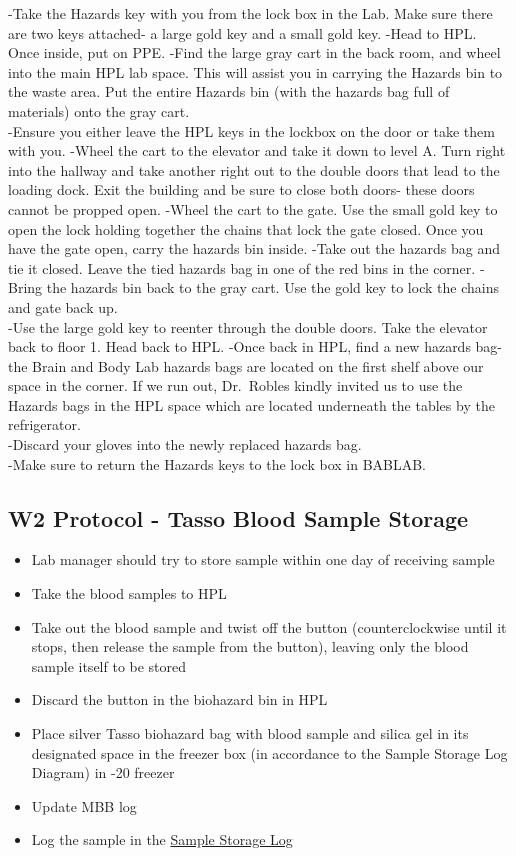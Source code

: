 \documentclass[
]{book}
\providecommand{\tightlist}{%
  \setlength{\itemsep}{0pt}\setlength{\parskip}{0pt}}
\begin{document}
-Take the Hazards key with you from the lock box in the Lab. Make sure there are two keys attached- a large gold key and a small gold key.
-Head to HPL. Once inside, put on PPE.
-Find the large gray cart in the back room, and wheel into the main HPL lab space. This will assist you in carrying the Hazards bin to the waste area. Put the entire Hazards bin (with the hazards bag full of materials) onto the gray cart.\\
-Ensure you either leave the HPL keys in the lockbox on the door or take them with you.
-Wheel the cart to the elevator and take it down to level A. Turn right into the hallway and take another right out to the double doors that lead to the loading dock. Exit the building and be sure to close both doors- these doors cannot be propped open.
-Wheel the cart to the gate. Use the small gold key to open the lock holding together the chains that lock the gate closed. Once you have the gate open, carry the hazards bin inside.
-Take out the hazards bag and tie it closed. Leave the tied hazards bag in one of the red bins in the corner.
-Bring the hazards bin back to the gray cart. Use the gold key to lock the chains and gate back up.\\
-Use the large gold key to reenter through the double doors. Take the elevator back to floor 1. Head back to HPL.
-Once back in HPL, find a new hazards bag- the Brain and Body Lab hazards bags are located on the first shelf above our space in the corner. If we run out, Dr.~Robles kindly invited us to use the Hazards bags in the HPL space which are located underneath the tables by the refrigerator.\\
-Discard your gloves into the newly replaced hazards bag.\\
-Make sure to return the Hazards keys to the lock box in BABLAB.

\hypertarget{w2-protocol---tasso-blood-sample-storage}{%
\subsection{W2 Protocol - Tasso Blood Sample Storage}\label{w2-protocol---tasso-blood-sample-storage}}

\begin{itemize}
\tightlist
\item
  Lab manager should try to store sample within one day of receiving sample
\item
  Take the blood samples to HPL
\item
  Take out the blood sample and twist off the button (counterclockwise until it stops, then release the sample from the button), leaving only the blood sample itself to be stored
\item
  Discard the button in the biohazard bin in HPL
\item
  Place silver Tasso biohazard bag with blood sample and silica gel in its designated space in the freezer box (in accordance to the Sample Storage Log Diagram) in -20 freezer
\item
  Update MBB log
\item
  Log the sample in the \href{https://app.box.com/file/630322897864}{Sample Storage Log}
\end{itemize}
\end{document}
